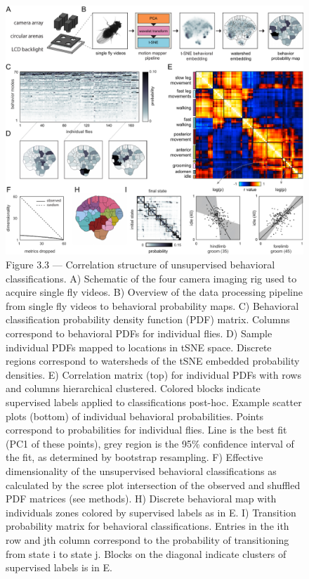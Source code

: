 \documentclass[12pt,letterpaper]{article}
\begin{document}
\begin{figure}[t!]
    \includegraphics[width=\textwidth]{../figures/chapter_3/fig_3-3.pdf}
    \vspace{.1in}
    \caption*{Figure 3.3 — Correlation structure of unsupervised behavioral classifications. A) Schematic of the four camera imaging rig used to acquire single fly videos. B) Overview of the data processing pipeline from single fly videos to behavioral probability maps. C) Behavioral classification probability density function (PDF) matrix. Columns correspond to behavioral PDFs for individual flies. D) Sample individual PDFs mapped to locations in tSNE space. Discrete regions correspond to watersheds of the tSNE embedded probability densities. E) Correlation matrix (top) for individual PDFs with rows and columns hierarchical clustered. Colored blocks indicate supervised labels applied to classifications post-hoc. Example scatter plots (bottom) of individual behavioral probabilities. Points correspond to probabilities for individual flies. Line is the best fit (PC1 of these points), grey region is the 95\% confidence interval of the fit, as determined by bootstrap resampling. F) Effective dimensionality of the unsupervised behavioral classifications as calculated by the scree plot intersection of the observed and shuffled PDF matrices (see methods). H)  Discrete behavioral map with individuals zones colored by supervised labels as in E. I) Transition probability matrix for behavioral classifications. Entries in the ith row and jth column correspond to the probability of transitioning from state i to state j. Blocks on the diagonal indicate clusters of supervised labels is in E.}
\end{figure}
\end{document}
